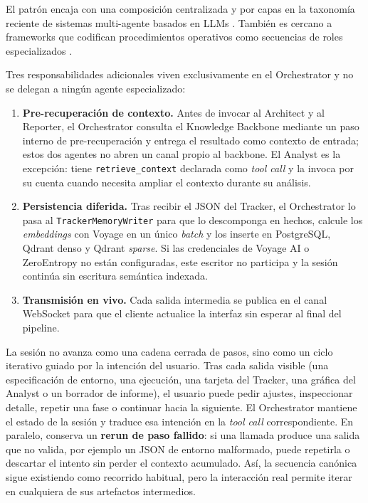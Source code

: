 El patrón encaja con una composición centralizada y por capas en la taxonomía
reciente de sistemas multi-agente basados en LLMs
\cite{guo2024llmbased}. También es cercano a frameworks que codifican
procedimientos operativos como secuencias de roles especializados
\cite{hong2024metagpt}.

Tres responsabilidades adicionales viven exclusivamente en el
Orchestrator y no se delegan a ningún agente especializado:

\begin{enumerate}
\item \textbf{Pre-recuperación de contexto.} Antes de invocar al
Architect y al Reporter, el Orchestrator consulta el Knowledge Backbone
mediante un paso interno de pre-recuperación y entrega el resultado como
contexto de entrada; estos dos agentes no abren un canal propio al backbone.
El Analyst es la excepción: tiene \texttt{retrieve\_context} declarada como
\textit{tool call} y la invoca por su cuenta cuando necesita ampliar el
contexto durante su análisis.
\item \textbf{Persistencia diferida.} Tras recibir el JSON del Tracker,
el Orchestrator lo pasa al \texttt{TrackerMemoryWriter} para que lo
descomponga en hechos, calcule los \textit{embeddings} con Voyage en un
único \textit{batch} y los inserte en PostgreSQL,
Qdrant denso y Qdrant \textit{sparse}. Si las credenciales de Voyage AI o
ZeroEntropy no están configuradas, este escritor no participa y la sesión
continúa sin escritura semántica indexada.
\item \textbf{Transmisión en vivo.} Cada salida intermedia se publica en
el canal WebSocket para que el cliente actualice la interfaz sin
esperar al final del pipeline.
\end{enumerate}

La sesión no avanza como una cadena cerrada de pasos, sino como un ciclo
iterativo guiado por la intención del usuario. Tras cada salida visible
(una especificación de entorno, una ejecución, una tarjeta del Tracker,
una gráfica del Analyst o un borrador de informe), el usuario puede pedir
ajustes, inspeccionar detalle, repetir una fase o continuar hacia la
siguiente. El Orchestrator mantiene el estado de la sesión y traduce esa
intención en la \textit{tool call} correspondiente. En paralelo, conserva
un \textbf{rerun de paso fallido}: si una llamada produce una salida que no
valida, por ejemplo un JSON de entorno malformado, puede repetirla o
descartar el intento sin perder el contexto acumulado. Así, la secuencia
canónica sigue existiendo como recorrido habitual, pero la interacción real
permite iterar en cualquiera de sus artefactos intermedios.

